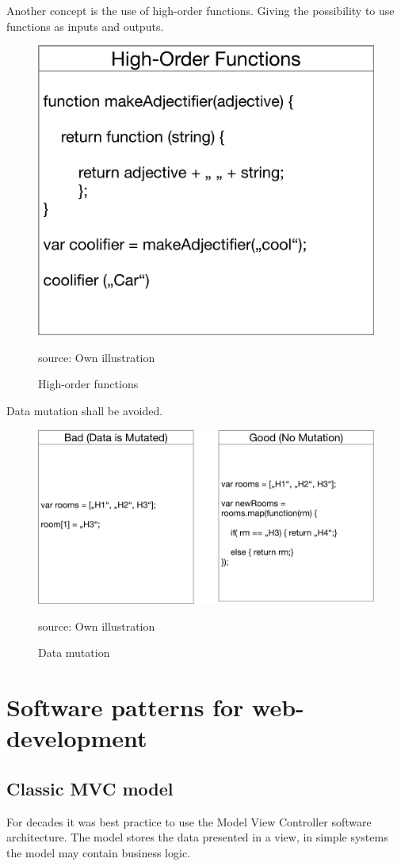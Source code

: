 Another concept is the use of high-order functions. Giving the possibility to use functions as inputs and outputs. 


\begin{figure}[H]
	\centering
	\includegraphics[width=0.5\linewidth]{bilder/grundlagen/fp1.png}
	\caption{High-order functions} source: Own illustration
	\label{fig:HF}
\end{figure}

Data mutation shall be avoided.

\begin{figure}[H]
	\centering
	\includegraphics[width=0.8\linewidth]{bilder/grundlagen/fp2.png}
	\caption{Data mutation} source: Own illustration
	\label{fig:DM}
\end{figure}

\newpage

\section{Software patterns for web-development}

\subsection{Classic MVC model}
For decades it was best practice to use the Model View Controller software architecture. The model stores the data presented in a view, in simple systems the model may contain business logic.

